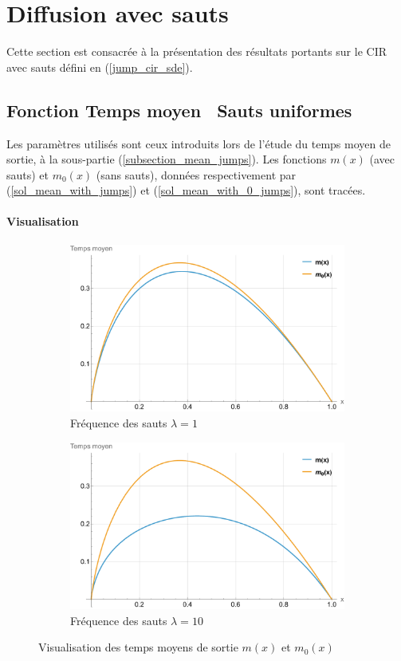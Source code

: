 \section{Diffusion avec sauts}
Cette section est consacrée à la présentation des résultats portants sur le \acs{CIR} avec sauts défini en (\ref{jump_cir_sde}).
\subsection{Fonction Temps moyen \textemdash~Sauts uniformes}
Les paramètres utilisés sont ceux introduits lors de l'étude du temps moyen de sortie, à la sous-partie (\ref{subsection_mean_jumps}). Les fonctions \( m(x) \) (avec sauts) et \( m_0(x) \) (sans sauts), données respectivement par (\ref{sol_mean_with_jumps}) et (\ref{sol_mean_with_0_jumps}), sont tracées.
\paragraph{Visualisation}\phantom{}
\begin{figure}[htb]
    \centering
    \begin{subfigure}{0.45\linewidth}
        \includegraphics[width=\linewidth]{img/validation/Jumps/mean_jumps.pdf}
        \caption{Fréquence des sauts $\lambda=1$}
    \end{subfigure}
    \hfill
    \begin{subfigure}{0.45\linewidth}
        \includegraphics[width=\linewidth]{img/validation/Jumps/mean_big_jumps.pdf}
        \caption{Fréquence des sauts $\lambda=10$}
    \end{subfigure}
    \caption{Visualisation des temps moyens de sortie $m(x)$ et $m_0(x)$}\label{fig:JumpsMeanVisualisation}
\end{figure}
